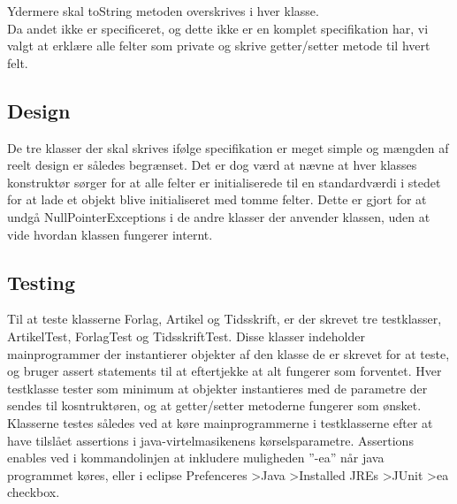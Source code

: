 Ydermere skal toString metoden overskrives i hver klasse.\\


Da andet ikke er specificeret, og dette ikke er en komplet specifikation har, vi valgt at erklære alle felter som private og skrive getter/setter metode til hvert felt.

\subsection{Design}
De tre klasser der skal skrives ifølge specifikation er meget simple og mængden af reelt design er således begrænset.
Det er dog værd at nævne at hver klasses konstruktør sørger for at alle felter er initialiserede til en standardværdi
i stedet for at lade et objekt blive initialiseret med tomme felter. Dette er gjort for at undgå NullPointerExceptions 
i de andre klasser der anvender klassen, uden at vide hvordan klassen fungerer internt.

\subsection{Testing}
Til at teste klasserne Forlag, Artikel og Tidsskrift, er der skrevet tre testklasser, ArtikelTest, ForlagTest og TidsskriftTest. Disse klasser indeholder mainprogrammer der instantierer objekter af den klasse de er skrevet for at teste, og bruger assert statements til at eftertjekke at alt fungerer som forventet.
Hver testklasse tester som minimum at objekter instantieres med de parametre der sendes til kosntruktøren, og at getter/setter metoderne fungerer som ønsket.
Klasserne testes således ved at køre mainprogrammerne i testklasserne efter at have tilslået assertions i java-virtelmasikenens
kørselsparametre. Assertions enables ved i kommandolinjen at inkludere muligheden ''-ea'' når java programmet køres,
eller i eclipse Prefenceres  \textgreater Java \textgreater Installed JREs \textgreater JUnit \textgreater ea checkbox.
